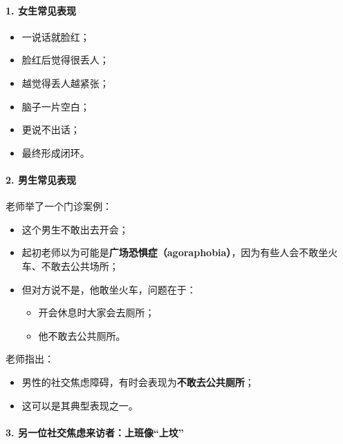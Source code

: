 \documentclass[
  chinese,
  9pt,
  a4paper,
]{ctexart}
\providecommand{\tightlist}{%
  \setlength{\itemsep}{0pt}\setlength{\parskip}{0pt}}
\begin{document}
\paragraph{1. 女生常见表现}\label{ux5973ux751fux5e38ux89c1ux8868ux73b0}

\begin{itemize}
\tightlist
\item
  一说话就脸红；
\item
  脸红后觉得很丢人；
\item
  越觉得丢人越紧张；
\item
  脑子一片空白；
\item
  更说不出话；
\item
  最终形成闭环。
\end{itemize}

\paragraph{2. 男生常见表现}\label{ux7537ux751fux5e38ux89c1ux8868ux73b0}

老师举了一个门诊案例：

\begin{itemize}
\item
  这个男生不敢出去开会；
\item
  起初老师以为可能是\textbf{广场恐惧症（agoraphobia）}，因为有些人会不敢坐火车、不敢去公共场所；
\item
  但对方说不是，他敢坐火车，问题在于：

  \begin{itemize}
  \tightlist
  \item
    开会休息时大家会去厕所；
  \item
    他不敢去公共厕所。
  \end{itemize}
\end{itemize}

老师指出：

\begin{itemize}
\tightlist
\item
  男性的社交焦虑障碍，有时会表现为\textbf{不敢去公共厕所}；
\item
  这可以是其典型表现之一。
\end{itemize}

\paragraph{3.
另一位社交焦虑来访者：上班像``上坟''}\label{ux53e6ux4e00ux4f4dux793eux4ea4ux7126ux8651ux6765ux8bbfux8005ux4e0aux73edux50cfux4e0aux575f}
\end{document}

